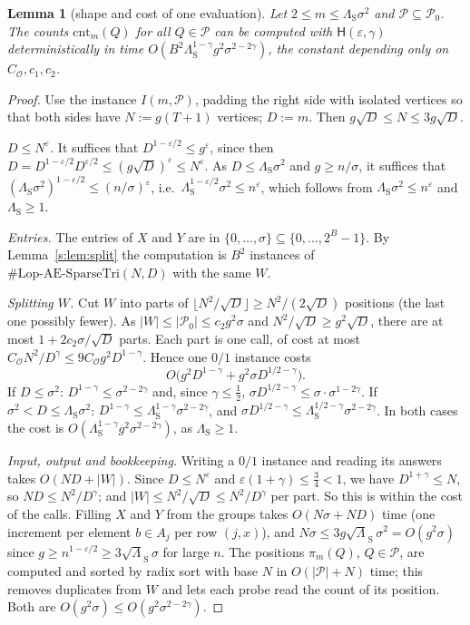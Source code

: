 \documentclass[11pt]{article}
\newtheorem{lemma}[theorem]{Lemma}
\theoremstyle{definition}
\theoremstyle{remark}
\newcommand{\Lop}{\mathrm{Lop}\text{-}\allowbreak\mathrm{AE}\text{-}\allowbreak\mathrm{SparseTri}}
\newcommand{\cnt}{\mathrm{cnt}}
\newcommand{\Pq}{\mathcal{P}}
\newcommand{\Hyp}{\mathsf{H}}
\begin{document}
\begin{lemma}[shape and cost of one evaluation]\label{s:lem:shape}
Let $2\le m\le\Lambda_{\mathrm S}\sigma^2$ and $\Pq\subseteq\Pq_0$. The counts $\cnt_m(Q)$ for all $Q\in\Pq$ can be computed with $\Hyp(\varepsilon,\gamma)$ deterministically in time $O(B^2\Lambda_{\mathrm S}^{1-\gamma}g^2\sigma^{2-2\gamma})$, the constant depending only on $C_{\mathcal O},c_1,c_2$.
\end{lemma}
\begin{proof}
Use the instance $I(m,\Pq)$, padding the right side with isolated vertices so that both sides have $N:=g(T+1)$ vertices; $D:=m$. Then $g\sqrt D\le N\le3g\sqrt D$.

\emph{$D\le N^\varepsilon$.} It suffices that $D^{1-\varepsilon/2}\le g^\varepsilon$, since then $D=D^{1-\varepsilon/2}D^{\varepsilon/2}\le(g\sqrt D)^\varepsilon\le N^\varepsilon$. As $D\le\Lambda_{\mathrm S}\sigma^2$ and $g\ge n/\sigma$, it suffices that $(\Lambda_{\mathrm S}\sigma^2)^{1-\varepsilon/2}\le(n/\sigma)^\varepsilon$, i.e.\ $\Lambda_{\mathrm S}^{1-\varepsilon/2}\sigma^2\le n^\varepsilon$, which follows from $\Lambda_{\mathrm S}\sigma^2\le n^\varepsilon$ and $\Lambda_{\mathrm S}\ge1$.

\emph{Entries.} The entries of $X$ and $Y$ are in $\{0,\dots,\sigma\}\subseteq\{0,\dots,2^B-1\}$. By Lemma~\ref{s:lem:split} the computation is $B^2$ instances of $\#\Lop(N,D)$ with the same $W$.

\emph{Splitting $W$.} Cut $W$ into parts of $\lfloor N^2/\sqrt D\rfloor\ge N^2/(2\sqrt D)$ positions (the last one possibly fewer). As $|W|\le|\Pq_0|\le c_2g^2\sigma$ and $N^2/\sqrt D\ge g^2\sqrt D$, there are at most $1+2c_2\sigma/\sqrt D$ parts. Each part is one call, of cost at most $C_{\mathcal O}N^2/D^\gamma\le9C_{\mathcal O}g^2D^{1-\gamma}$. Hence one $0/1$ instance costs
\[
O\big(g^2D^{1-\gamma}+g^2\sigma D^{1/2-\gamma}\big).
\]
If $D\le\sigma^2$: $D^{1-\gamma}\le\sigma^{2-2\gamma}$ and, since $\gamma\le\frac12$, $\sigma D^{1/2-\gamma}\le\sigma\cdot\sigma^{1-2\gamma}$. If $\sigma^2<D\le\Lambda_{\mathrm S}\sigma^2$: $D^{1-\gamma}\le\Lambda_{\mathrm S}^{1-\gamma}\sigma^{2-2\gamma}$, and $\sigma D^{1/2-\gamma}\le\Lambda_{\mathrm S}^{1/2-\gamma}\sigma^{2-2\gamma}$. In both cases the cost is $O(\Lambda_{\mathrm S}^{1-\gamma}g^2\sigma^{2-2\gamma})$, as $\Lambda_{\mathrm S}\ge1$.

\emph{Input, output and bookkeeping.} Writing a $0/1$ instance and reading its answers takes $O(ND+|W|)$. Since $D\le N^\varepsilon$ and $\varepsilon(1+\gamma)\le\frac34<1$, we have $D^{1+\gamma}\le N$, so $ND\le N^2/D^\gamma$; and $|W|\le N^2/\sqrt D\le N^2/D^\gamma$ per part. So this is within the cost of the calls. Filling $X$ and $Y$ from the groups takes $O(N\sigma+ND)$ time (one increment per element $b\in A_j$ per row $(j,x)$), and $N\sigma\le3g\sqrt\Lambda_{\mathrm S}\,\sigma^2=O(g^2\sigma)$ since $g\ge n^{1-\varepsilon/2}\ge3\sqrt\Lambda_{\mathrm S}\,\sigma$ for large $n$. The positions $\pi_m(Q)$, $Q\in\Pq$, are computed and sorted by radix sort with base $N$ in $O(|\Pq|+N)$ time; this removes duplicates from $W$ and lets each probe read the count of its position. Both are $O(g^2\sigma)\le O(g^2\sigma^{2-2\gamma})$.
\end{proof}
\end{document}
